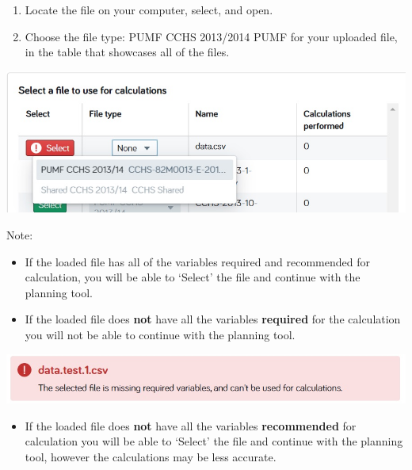 \documentclass[]{book}
\providecommand{\tightlist}{%
  \setlength{\itemsep}{0pt}\setlength{\parskip}{0pt}}
\begin{document}
\begin{enumerate}
\def\labelenumi{\arabic{enumi}.}
\setcounter{enumi}{1}
\item
  Locate the file on your computer, select, and open.
\item
  Choose the file type: PUMF CCHS 2013/2014 PUMF for your uploaded file,
  in the table that showcases all of the files.
\end{enumerate}

\begin{center}\includegraphics{Images/Datafiles-Load-Filetype} \end{center}

Note:

\begin{itemize}
\item
  If the loaded file has all of the variables required and recommended
  for calculation, you will be able to `Select' the file and continue
  with the planning tool.
\item
  If the loaded file does \textbf{not} have all the variables
  \textbf{required} for the calculation you will not be able to continue
  with the planning tool.
\end{itemize}

\begin{center}\includegraphics{Images/Datafiles-Load-Error} \end{center}

\begin{itemize}
\tightlist
\item
  If the loaded file does \textbf{not} have all the variables
  \textbf{recommended} for calculation you will be able to `Select' the
  file and continue with the planning tool, however the calculations may
  be less accurate.
\end{itemize}
\end{document}
